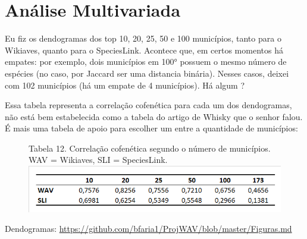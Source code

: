 \section{Análise Multivariada}

Eu fiz os dendogramas dos top 10, 20, 25, 50 e 100 municípios, tanto para o Wikiaves, quanto para o SpeciesLink. Acontece que, em certos momentos há empates: por exemplo, dois municípios em 100° possuem o mesmo número de espécies (no caso, por Jaccard ser uma distancia binária). Nesses casos, deixei com 102 municípios (há um empate de 4 municípios). Há algum ?

Essa tabela representa a correlação cofenética para cada um dos dendogramas, não está bem estabelecida como a tabela do artigo de Whisky que o senhor falou. É mais uma tabela de apoio para escolher um  entre a quantidade de municípios:

\begin{figure}[h!]
{\scriptsize Tabela 12. Correlação cofenética segundo o número de municípios. WAV = Wikiaves, SLI = SpeciesLink.}
\centering
\includegraphics{Tabelas/12.png}
\end{figure}

Dendogramas: \href{https://github.com/bfaria1/ProjWAV/blob/master/Figuras.md}{https://github.com/bfaria1/ProjWAV/blob/master/Figuras.md}
